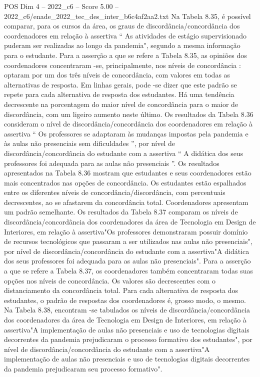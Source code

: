 \begin{textsample}{POS Dim 4 – 2022\_c6 – Score 5.00 – 2022\_c6/enade\_2022\_tec\_des\_inter\_b6c4af2aa2.txt}
Na Tabela 8.35, é possível comparar, para os cursos da área, os graus de discordância/concordância dos coordenadores em relação à assertiva “ As atividades de estágio supervisionado puderam ser realizadas ao longo da pandemia", segundo a mesma informação para o estudante.
Para a asserção a que se refere a Tabela 8.35, as opiniões dos coordenadores concentraram -se, principalmente, nos níveis de concordância : optaram por um dos três níveis de concordância, com valores em todas as alternativas de resposta.
Em linhas gerais, pode -se dizer que este padrão se repete para cada alternativa de resposta dos estudantes.
Há uma tendência decrescente na porcentagem do maior nível de concordância para o maior de discordância, com um ligeiro aumento neste último.
Os resultados da Tabela 8.36 consideram o nível de discordância/concordância dos coordenadores em relação à assertiva “ Os professores se adaptaram às mudanças impostas pela pandemia e às aulas não presenciais sem dificuldades ”, por nível de discordância/concordância do estudante com a assertiva “ A didática dos seus professores foi adequada para as aulas não presenciais ”.
Os resultados apresentados na Tabela 8.36 mostram que estudantes e seus coordenadores estão mais concentrados nas opções de concordância.
Os estudantes estão espalhados entre os diferentes níveis de concordância/discordância, com percentuais decrescentes, ao se afastarem da concordância total.
Coordenadores apresentam um padrão semelhante.
Os resultados da Tabela 8.37 comparam os níveis de discordância/concordância dos coordenadores da área de Tecnologia em Design de Interiores, em relação à assertiva"Os professores demonstraram possuir domínio de recursos tecnológicos que passaram a ser utilizados nas aulas não presenciais", por nível de discordância/concordância do estudante com a assertiva"A didática dos seus professores foi adequada para as aulas não presenciais".
Para a asserção a que se refere a Tabela 8.37, os coordenadores também concentraram todas suas opções nos níveis de concordância.
Os valores são decrescentes com o distanciamento da concordância total.
Para cada alternativa de resposta dos estudantes, o padrão de respostas dos coordenadores é, grosso modo, o mesmo.
Na Tabela 8.38, encontram -se tabulados os níveis de discordância/concordância dos coordenadores da área de Tecnologia em Design de Interiores, em relação à assertiva"A implementação de aulas não presenciais e uso de tecnologias digitais decorrentes da pandemia prejudicaram o processo formativo dos estudantes", por nível de discordância/concordância do estudante com a assertiva"A implementação de aulas não presenciais e uso de tecnologias digitais decorrentes da pandemia prejudicaram seu processo formativo".

\end{textsample}
